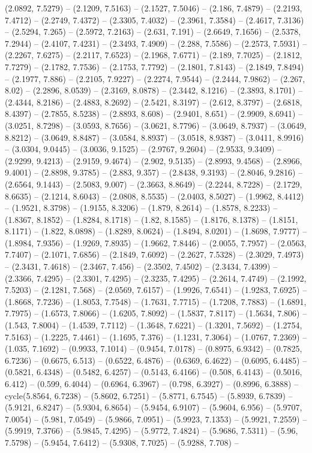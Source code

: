 (2.0892, 7.5279) -- (2.1209, 7.5163) -- (2.1527, 7.5046) -- (2.186, 7.4879) -- (2.2193, 7.4712) -- (2.2749, 7.4372) -- (2.3305, 7.4032) -- (2.3961, 7.3584) -- (2.4617, 7.3136) -- (2.5294, 7.265) -- (2.5972, 7.2163) -- (2.631, 7.191) -- (2.6649, 7.1656) -- (2.5378, 7.2944) -- (2.4107, 7.4231) -- (2.3493, 7.4909) -- (2.288, 7.5586) -- (2.2573, 7.5931) -- (2.2267, 7.6275) -- (2.2117, 7.6523) -- (2.1968, 7.6771) -- (2.189, 7.7025) -- (2.1812, 7.7279) -- (2.1782, 7.7536) -- (2.1753, 7.7792) -- (2.1801, 7.8143) -- (2.1849, 7.8494) -- (2.1977, 7.886) -- (2.2105, 7.9227) -- (2.2274, 7.9544) -- (2.2444, 7.9862) -- (2.267, 8.02) -- (2.2896, 8.0539) -- (2.3169, 8.0878) -- (2.3442, 8.1216) -- (2.3893, 8.1701) -- (2.4344, 8.2186) -- (2.4883, 8.2692) -- (2.5421, 8.3197) -- (2.612, 8.3797) -- (2.6818, 8.4397) -- (2.7855, 8.5238) -- (2.8893, 8.608) -- (2.9401, 8.651) -- (2.9909, 8.6941) -- (3.0251, 8.7298) -- (3.0593, 8.7656) -- (3.0621, 8.7796) -- (3.0649, 8.7937) -- (3.0649, 8.8212) -- (3.0649, 8.8487) -- (3.0584, 8.8937) -- (3.0518, 8.9387) -- (3.0411, 8.9916) -- (3.0304, 9.0445) -- (3.0036, 9.1525) -- (2.9767, 9.2604) -- (2.9533, 9.3409) -- (2.9299, 9.4213) -- (2.9159, 9.4674) -- (2.902, 9.5135) -- (2.8993, 9.4568) -- (2.8966, 9.4001) -- (2.8898, 9.3785) -- (2.883, 9.357) -- (2.8438, 9.3193) -- (2.8046, 9.2816) -- (2.6564, 9.1443) -- (2.5083, 9.007) -- (2.3663, 8.8649) -- (2.2244, 8.7228) -- (2.1729, 8.6635) -- (2.1214, 8.6043) -- (2.0808, 8.5535) -- (2.0403, 8.5027) -- (1.9962, 8.4412) -- (1.9521, 8.3798) -- (1.9155, 8.3206) -- (1.879, 8.2614) -- (1.8578, 8.2233) -- (1.8367, 8.1852) -- (1.8284, 8.1718) -- (1.82, 8.1585) -- (1.8176, 8.1378) -- (1.8151, 8.1171) -- (1.822, 8.0898) -- (1.8289, 8.0624) -- (1.8494, 8.0201) -- (1.8698, 7.9777) -- (1.8984, 7.9356) -- (1.9269, 7.8935) -- (1.9662, 7.8446) -- (2.0055, 7.7957) -- (2.0563, 7.7407) -- (2.1071, 7.6856) -- (2.1849, 7.6092) -- (2.2627, 7.5328) -- (2.3029, 7.4973) -- (2.3431, 7.4618) -- (2.3467, 7.456) -- (2.3502, 7.4502) -- (2.3434, 7.4399) -- (2.3366, 7.4295) -- (2.3301, 7.4295) -- (2.3235, 7.4295) -- (2.2614, 7.4749) -- (2.1992, 7.5203) -- (2.1281, 7.568) -- (2.0569, 7.6157) -- (1.9926, 7.6541) -- (1.9283, 7.6925) -- (1.8668, 7.7236) -- (1.8053, 7.7548) -- (1.7631, 7.7715) -- (1.7208, 7.7883) -- (1.6891, 7.7975) -- (1.6573, 7.8066) -- (1.6205, 7.8092) -- (1.5837, 7.8117) -- (1.5634, 7.806) -- (1.543, 7.8004) -- (1.4539, 7.7112) -- (1.3648, 7.6221) -- (1.3201, 7.5692) -- (1.2754, 7.5163) -- (1.2225, 7.4461) -- (1.1695, 7.376) -- (1.1231, 7.3064) -- (1.0767, 7.2369) -- (1.035, 7.1692) -- (0.9933, 7.1014) -- (0.9454, 7.0178) -- (0.8975, 6.9342) -- (0.7825, 6.7236) -- (0.6675, 6.513) -- (0.6522, 6.4876) -- (0.6369, 6.4622) -- (0.6095, 6.4485) -- (0.5821, 6.4348) -- (0.5482, 6.4257) -- (0.5143, 6.4166) -- (0.508, 6.4143) -- (0.5016, 6.412) -- (0.599, 6.4044) -- (0.6964, 6.3967) -- (0.798, 6.3927) -- (0.8996, 6.3888) -- cycle(5.8564, 6.7238) -- (5.8602, 6.7251) -- (5.8771, 6.7545) -- (5.8939, 6.7839) -- (5.9121, 6.8247) -- (5.9304, 6.8654) -- (5.9454, 6.9107) -- (5.9604, 6.956) -- (5.9707, 7.0054) -- (5.981, 7.0549) -- (5.9866, 7.0951) -- (5.9923, 7.1353) -- (5.9921, 7.2559) -- (5.9919, 7.3766) -- (5.9845, 7.4295) -- (5.9772, 7.4824) -- (5.9686, 7.5311) -- (5.96, 7.5798) -- (5.9454, 7.6412) -- (5.9308, 7.7025) -- (5.9288, 7.708) -- 
